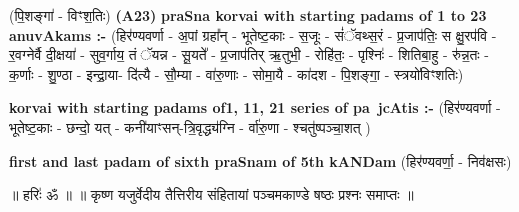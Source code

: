\documentclass[17pt]{extarticle}
\begin{document}
                  \newline
                      (पि॒शङ्गा॑ - विꣳश॒तिः)  \textbf{(A23)} \newline \newline
\textbf{praSna korvai with starting padams of 1 to 23 anuvAkams :-} \newline
(हिर॑ण्यवर्णा - अ॒पां ग्रहा᳚न् - भूतेष्ट॒काः - स॒जूः - सं॑ॅवथ्स॒रं - प्र॒जाप॑तिः॒ स क्षु॒रप॑वि - र॒वग्नेर्वै दी॒क्षया॑ - सुव॒र्गाय॒ तं ॅयन्न - सू॒यते᳚ - प्र॒जाप॑तिर् ऋ॒तुभी॒ - रोहि॑तः॒ - पृश्निः॑ - शितिबा॒हु - रु॑न्न॒तः - क॒र्णाः - शु॒ण्ठा - इन्द्रा॒या- दि॑त्यै - सौ॒म्या - वा॑रु॒णाः - सोमा॒यै - का॑दश - पि॒शङ्गा॒ - स्त्रयो॑विꣳशतिः) \newline

\textbf{korvai with starting padams of1, 11, 21 series of pa~jcAtis :-} \newline
(हिर॑ण्यवर्णा - भूतेष्ट॒काः - छन्दो॒ यत् - कनी॑याꣳसन्-त्रि॒वृद्ध्य॑ग्नि - र्वा॑रु॒णा - श्चतु॑ष्पञ्चा॒शत् ) \newline

\textbf{first and last padam of sixth praSnam of 5th kANDam} \newline
(हिर॑ण्यवर्णा॒ - निव॑क्षसः) \newline 


॥ हरिः॑ ॐ ॥
॥ कृष्ण यजुर्वेदीय तैत्तिरीय संहितायां पञ्चमकाण्डे षष्ठः प्रश्नः समाप्तः ॥ \newline
\pagebreak
\pagebreak
        
\end{document}
